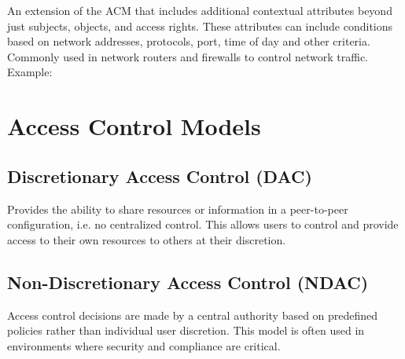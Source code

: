 \documentclass[12pt letter]{report}
\begin{document}
An extension of the ACM that includes additional contextual attributes
beyond just subjects, objects, and access rights. These attributes
can include conditions based on network addresses, protocols, port,
time of day and other criteria. Commonly used in network routers and
firewalls to control network traffic.
Example:
\begin{figure}[H]
  \centering
\end{figure}

\chapter{Access Control Models}

\section{Discretionary Access Control (DAC)}

Provides the ability to share resources or information in a
peer-to-peer configuration, i.e. no centralized control. This allows
users to control and provide access to their own resources to others
at their discretion.

\section{Non-Discretionary Access Control (NDAC)}

Access control decisions are made by a central authority based on
predefined policies rather than individual user discretion. This
model is often used in environments where security and compliance are
critical.
\end{document}
